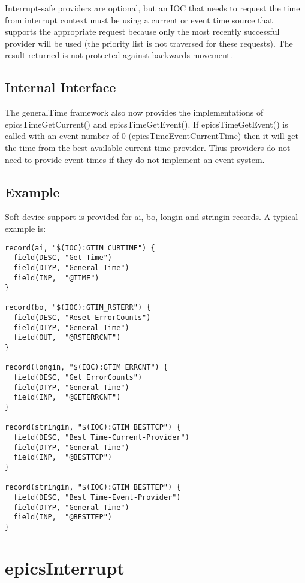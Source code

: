 Interrupt-safe providers are optional, but an IOC that needs to request the time from interrupt context must be using a 
current or event time source that supports the appropriate request because only the most recently successful provider will 
be used (the priority list is not traversed for these requests). The result returned is not protected against backwards 
movement.

\subsection{Internal Interface}

The generalTime framework also now provides the implementations of epicsTimeGetCurrent() and epicsTimeGetEvent(). 
If epicsTimeGetEvent() is called with an event number of 0 (epicsTimeEventCurrentTime) then it will get the time from 
the best available current time provider.  Thus providers do not need to provide event times if they do not implement an 
event system.

\subsection{Example}

Soft device support is provided for ai, bo, longin and stringin records. A typical example is:

\begin{verbatim}
record(ai, "$(IOC):GTIM_CURTIME") {
  field(DESC, "Get Time")
  field(DTYP, "General Time")
  field(INP,  "@TIME")
}

record(bo, "$(IOC):GTIM_RSTERR") {
  field(DESC, "Reset ErrorCounts")
  field(DTYP, "General Time")
  field(OUT,  "@RSTERRCNT")
}

record(longin, "$(IOC):GTIM_ERRCNT") {
  field(DESC, "Get ErrorCounts")
  field(DTYP, "General Time")
  field(INP,  "@GETERRCNT")
}

record(stringin, "$(IOC):GTIM_BESTTCP") {
  field(DESC, "Best Time-Current-Provider")
  field(DTYP, "General Time")
  field(INP,  "@BESTTCP")
}

record(stringin, "$(IOC):GTIM_BESTTEP") {
  field(DESC, "Best Time-Event-Provider")
  field(DTYP, "General Time")
  field(INP,  "@BESTTEP")
}
\end{verbatim}

\section{epicsInterrupt}

